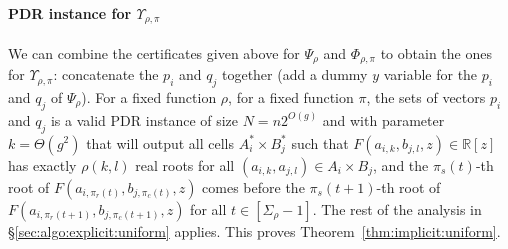 \paragraph{PDR instance for $\Upsilon_{\rho,\pi}$}

We can combine the certificates given above for $\Psi_\rho$ and
$\Phi_{\rho,\pi}$ to obtain the ones for $\Upsilon_{\rho,\pi}$: concatenate the
$p_i$ and $q_j$ together (add a dummy $y$ variable for the $p_i$ and $q_j$ of
$\Psi_\rho$).
%
For a fixed function $\rho$,
for a fixed function $\pi$,
the sets of vectors $p_i$ and $q_j$ is a valid PDR instance
of size $N = n 2^{O(g)}$ and with parameter $k = \Theta(g^2)$
that will
output all cells $A^*_i \times B^*_j$ such that
$F(a_{i,k},b_{j,l},z) \in
\mathbb{R}[z]$ has exactly $\rho(k,l)$ real roots for all $(a_{i,k},a_{j,l}) \in A_i
\times B_j$,
and the $\pi_s(t)$-th root of $F(a_{i,\pi_r(t)},b_{j,\pi_c(t)},z)$
comes before the $\pi_s(t+1)$-th root of $F(a_{i,\pi_r(t+1)},b_{j,\pi_c(t+1)},z)$
for all $t \in [\Sigma_\rho-1]$.
%
The rest of the analysis in \S\ref{sec:algo:explicit:uniform} applies.
This proves Theorem~\ref{thm:implicit:uniform}.
